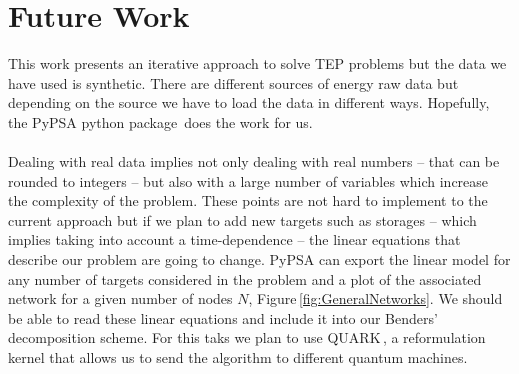 \section{Future Work}
This work presents an iterative approach to solve TEP problems but the data we have used is synthetic. There are different sources of energy raw data but depending on the source we have to load the data in different ways. Hopefully, the PyPSA python package\,\cite{PyPSA-Eur:PyPSA-Eur} does the work for us.\\\\
Dealing with real data implies not only dealing with real numbers -- that can be rounded to integers -- but also with a large number of variables which increase the complexity of the problem. These points are not hard to implement to the current approach but if we plan to add new targets such as storages -- which implies taking into account a time-dependence -- the linear equations that describe our problem are going to change. PyPSA can export the linear model for any number of targets considered in the problem and a plot of the associated network for a given number of nodes $N$, Figure\,\ref{fig:GeneralNetworks}. We should be able to read these linear equations and include it into our Benders' decomposition scheme. For this taks we plan to use QUARK\,\cite{dlrsc2023quark}, a reformulation kernel that allows us to send the algorithm to different quantum machines.
